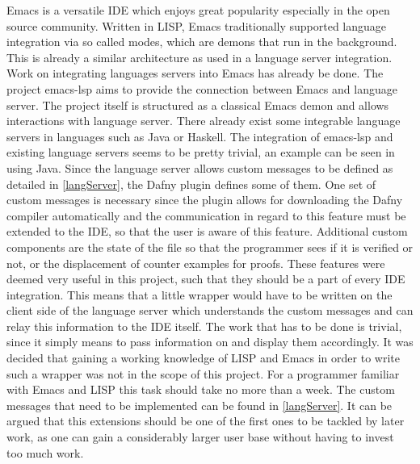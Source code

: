 Emacs \cite{GNU} is a versatile IDE which enjoys great popularity especially in the open source community. Written in LISP, Emacs traditionally supported language integration via so called modes, which are demons that run in the background. This is already a similar architecture as used in a language server integration. \newline
Work on integrating languages servers into Emacs has already be done. The project emacs-lsp \cite{emacsLsp} aims to provide the connection between Emacs and language server. The project itself is structured as a classical Emacs demon and allows interactions with language server. There already exist some integrable language servers in languages such as Java or Haskell. The integration of emacs-lsp and existing language servers seems to be pretty trivial, an example can be seen in \cite{javaEmacs} using Java. \newline
Since the language server allows custom messages to be defined as detailed in \ref{langServer}, the Dafny plugin defines some of them. One set of custom messages is necessary since the plugin allows for downloading the Dafny compiler automatically and the communication in regard to this feature must be extended to the IDE, so that the user is aware of this feature. Additional custom components are the state of the file so that the programmer sees if it is verified or not, or the displacement of counter examples for proofs.\newline
These features were deemed very useful in this project, such that they should be a part of every IDE integration. This means that a little wrapper would have to be written on the client side of the language server which understands the custom messages and can relay this information to the IDE itself. The work that has to be done is trivial, since it simply means to pass information on and display them accordingly. \newline
It was decided that gaining a working knowledge of LISP and Emacs in order to write such a wrapper was not in the scope of this project. For a programmer familiar with Emacs and LISP this task should take no more than a week. The custom messages that need to be implemented can be found in  \ref{langServer}. It can be argued that this extensions should be one of the first ones to be tackled by later work, as one can gain a considerably larger user base without having to invest too much work. \newline